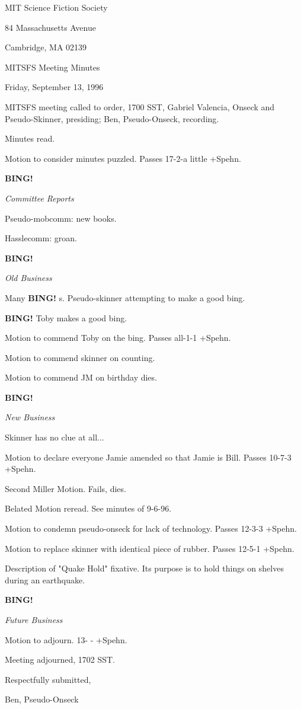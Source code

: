 \documentclass[12pt]{article}
\newcommand{\bing}{{\bf BING!} }
\newcommand{\goto}[1]{\bing \vskip 12pt \centerline{{\em{#1}}}}
\begin{document}
\begin{center}

MIT Science Fiction Society 

84 Massachusetts Avenue

Cambridge, MA 02139

\vspace{12pt}

MITSFS Meeting Minutes 

Friday, September 13, 1996

\end{center}
 
\vspace{18pt}

\setlength{\parskip}{6pt}

\noindent
MITSFS meeting called to order, 1700 SST,
Gabriel Valencia, Onseck and Pseudo-Skinner, presiding; Ben, Pseudo-Onseck, recording.

Minutes read.

Motion to consider minutes puzzled. Passes 17-2-a little +Spehn.

\goto{Committee Reports}

Pseudo-mobcomm: new books.

Hasslecomm: groan.

\goto{Old Business}

Many \bing s. Pseudo-skinner attempting to make a good bing.

\bing Toby makes a good bing.

Motion to commend Toby on the bing. Passes all-1-1 +Spehn.

Motion to commend skinner on counting.

Motion to commend JM on birthday dies.

\goto{New Business}

Skinner has no clue at all...

Motion to declare everyone Jamie amended so that Jamie is Bill. Passes 10-7-3 +Spehn.

Second Miller Motion. Fails, dies.

Belated Motion reread. See minutes of 9-6-96.

Motion to condemn pseudo-onseck for lack of technology. Passes 12-3-3 +Spehn.

Motion to replace skinner with identical piece of rubber. Passes 12-5-1 +Spehn.

Description of "Quake Hold" fixative. Its purpose is to hold things on shelves during an earthquake.

\goto{Future Business}

Motion to adjourn. 13- -  +Spehn.

\vspace{12pt}

\noindent
Meeting adjourned, 1702 SST.

\vspace{18pt}

\centerline{Respectfully submitted,}
\centerline{Ben, Pseudo-Onseck}
\end{document}
